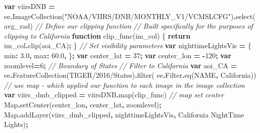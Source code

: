\documentclass[
]{article}
\newenvironment{Shaded}{\begin{snugshade}}{\end{snugshade}}
\newcommand{\AttributeTok}[1]{\textcolor[rgb]{0.77,0.63,0.00}{#1}}
\newcommand{\BuiltInTok}[1]{#1}
\newcommand{\CommentTok}[1]{\textcolor[rgb]{0.56,0.35,0.01}{\textit{#1}}}
\newcommand{\ControlFlowTok}[1]{\textcolor[rgb]{0.13,0.29,0.53}{\textbf{#1}}}
\newcommand{\DataTypeTok}[1]{\textcolor[rgb]{0.13,0.29,0.53}{#1}}
\newcommand{\DecValTok}[1]{\textcolor[rgb]{0.00,0.00,0.81}{#1}}
\newcommand{\FloatTok}[1]{\textcolor[rgb]{0.00,0.00,0.81}{#1}}
\newcommand{\FunctionTok}[1]{\textcolor[rgb]{0.00,0.00,0.00}{#1}}
\newcommand{\KeywordTok}[1]{\textcolor[rgb]{0.13,0.29,0.53}{\textbf{#1}}}
\newcommand{\NormalTok}[1]{#1}
\newcommand{\OperatorTok}[1]{\textcolor[rgb]{0.81,0.36,0.00}{\textbf{#1}}}
\newcommand{\StringTok}[1]{\textcolor[rgb]{0.31,0.60,0.02}{#1}}
\begin{document}
\begin{Shaded}
\begin{Highlighting}[]
\KeywordTok{var}\NormalTok{ viirsDNB }\OperatorTok{=}\NormalTok{ ee}\OperatorTok{.}\FunctionTok{ImageCollection}\NormalTok{(}\StringTok{"NOAA/VIIRS/DNB/MONTHLY\_V1/VCMSLCFG"}\NormalTok{)}\OperatorTok{.}\FunctionTok{select}\NormalTok{(}\StringTok{\textquotesingle{}avg\_rad\textquotesingle{}}\NormalTok{)}
\CommentTok{// Define our clipping function}
\CommentTok{// Built specifically for the purposes of clipping to California}
\KeywordTok{function} \FunctionTok{clip\_func}\NormalTok{(im\_col) \{}
    \ControlFlowTok{return}\NormalTok{ im\_col}\OperatorTok{.}\FunctionTok{clip}\NormalTok{(aoi\_CA)}\OperatorTok{;}
\NormalTok{\}}
\CommentTok{// Set visibility parameters}
\KeywordTok{var}\NormalTok{ nighttimeLightsVis }\OperatorTok{=}\NormalTok{ \{}
  \DataTypeTok{min}\OperatorTok{:} \FloatTok{3.0}\OperatorTok{,}
  \DataTypeTok{max}\OperatorTok{:} \FloatTok{60.0}\OperatorTok{,}
\NormalTok{\}}\OperatorTok{;}
\KeywordTok{var}\NormalTok{ center\_lat }\OperatorTok{=} \DecValTok{37}\OperatorTok{;}
\KeywordTok{var}\NormalTok{ center\_lon }\OperatorTok{=} \OperatorTok{{-}}\DecValTok{120}\OperatorTok{;}
\KeywordTok{var}\NormalTok{ zoomlevel}\OperatorTok{=}\DecValTok{6}\OperatorTok{;}
\CommentTok{// Boundary of States}
\CommentTok{// Filter to California }
\KeywordTok{var}\NormalTok{ aoi\_CA }\OperatorTok{=}\NormalTok{ ee}\OperatorTok{.}\FunctionTok{FeatureCollection}\NormalTok{(}\StringTok{\textquotesingle{}TIGER/2016/States\textquotesingle{}}\NormalTok{)}\OperatorTok{.}\FunctionTok{filter}\NormalTok{(}
\NormalTok{  ee}\OperatorTok{.}\AttributeTok{Filter}\OperatorTok{.}\FunctionTok{eq}\NormalTok{(}\StringTok{\textquotesingle{}NAME\textquotesingle{}}\OperatorTok{,} \StringTok{\textquotesingle{}California\textquotesingle{}}\NormalTok{))}
\CommentTok{// use \textasciigrave{}map\textasciigrave{} {-} which applied our function to each image in the image collection}
\KeywordTok{var}\NormalTok{ viirs\_dmb\_clipped }\OperatorTok{=}\NormalTok{ viirsDNB}\OperatorTok{.}\FunctionTok{map}\NormalTok{(clip\_func)}
\CommentTok{// map set center }
\BuiltInTok{Map}\OperatorTok{.}\FunctionTok{setCenter}\NormalTok{(center\_lon}\OperatorTok{,}\NormalTok{ center\_lat}\OperatorTok{,}\NormalTok{ zoomlevel)}\OperatorTok{;}
\BuiltInTok{Map}\OperatorTok{.}\FunctionTok{addLayer}\NormalTok{(viirs\_dmb\_clipped}\OperatorTok{,}\NormalTok{ nighttimeLightsVis}\OperatorTok{,} \StringTok{\textquotesingle{}California NightTime Lights\textquotesingle{}}\NormalTok{)}\OperatorTok{;}
\end{Highlighting}
\end{Shaded}
\end{document}
